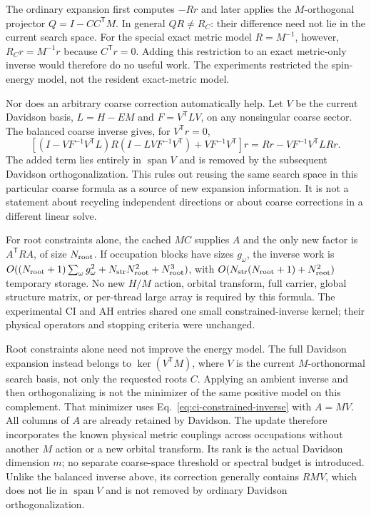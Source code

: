 \documentclass[11pt,a4paper]{article}
\newcommand{\Tr}{^{\mathsf T}}
\begin{document}
The ordinary expansion first computes $-Rr$ and later applies the
$M$-orthogonal projector $Q=I-CC\Tr M$. In general
$Q R\ne R_C$: their difference need not lie in the current search space.
For the special exact metric model $R=M^{-1}$, however,
$R_Cr=M^{-1}r$ because $C\Tr r=0$. Adding this restriction to an exact
metric-only inverse would therefore do no useful work. The experiments
restricted the spin-energy model, not the resident exact-metric model.

Nor does an arbitrary coarse correction automatically help. Let $V$ be
the current Davidson basis, $L=H-EM$ and $F=V\Tr LV$, on any nonsingular
coarse sector. The balanced coarse inverse gives, for $V\Tr r=0$,
\begin{equation}
 \left[(I-VF^{-1}V\Tr L)R(I-LVF^{-1}V\Tr)
       +VF^{-1}V\Tr\right]r
 =Rr-VF^{-1}V\Tr LRr.
\end{equation}
The added term lies entirely in $\operatorname{span}V$ and is removed by
the subsequent Davidson orthogonalization. This rules out reusing the
same search space in this particular coarse formula as a source of new
expansion information. It is not a statement about recycling independent
directions or about coarse corrections in a different linear solve.

For root constraints alone, the cached $MC$ supplies $A$ and the only new
factor is $A\Tr RA$, of size $N_{\rm root}$. If occupation blocks have sizes
$g_\omega$, the inverse work is
$O((N_{\rm root}+1)\sum_\omega g_\omega^2
  +N_{\rm str}N_{\rm root}^2+N_{\rm root}^3)$, with
$O(N_{\rm str}(N_{\rm root}+1)+N_{\rm root}^2)$ temporary storage.
No new $H/M$ action, orbital transform, full carrier, global structure
matrix, or per-thread large array is required by this formula. The
experimental CI and AH entries shared one small constrained-inverse kernel;
their physical operators and stopping criteria were unchanged.

Root constraints alone need not improve the energy model. The full
Davidson expansion instead belongs to $\ker(V\Tr M)$, where $V$ is the
current $M$-orthonormal search basis, not only the requested roots $C$.
Applying an ambient inverse and then orthogonalizing is not the minimizer
of the same positive model on this complement. That minimizer uses
Eq.~\eqref{eq:ci-constrained-inverse} with $A=MV$. All columns of $A$
are already retained by Davidson. The update therefore incorporates
the known physical metric couplings across occupations without another
$M$ action or a new orbital transform. Its rank is the actual Davidson
dimension $m$; no separate coarse-space threshold or spectral budget is
introduced. Unlike the balanced inverse above, its correction generally
contains $R M V$, which does not lie in $\operatorname{span}V$ and is not
removed by ordinary Davidson orthogonalization.
\end{document}
